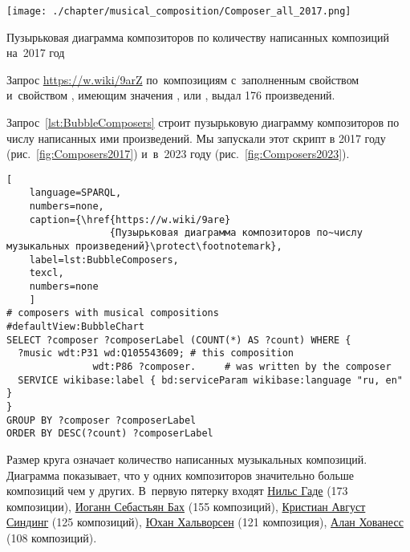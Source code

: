 \begin{marginfigure}[-0\baselineskip]
  \texttt{[image: ./chapter/musical\_composition/Composer\_all\_2017.png]}
  \vspace{-7pt}
  \caption[Пузырьковая диаграмма композиторов по количеству написанных композиций на~2017 год]{Пузырьковая диаграмма композиторов по количеству написанных композиций на~2017 год}%
  \label{fig:Composers2017}%
\end{marginfigure}

Запрос \href{https://w.wiki/9arZ}{https://w.wiki/9arZ} 
по~композициям с~заполненным свойством  
и~свойством , 
имеющим значения ,  или , 
выдал 176 произведений.


\newpage
Запрос~\ref{lst:BubbleComposers} строит пузырьковую диаграмму композиторов по числу написанных ими произведений.
Мы запускали этот скрипт в 2017 году (рис.~\ref{fig:Composers2017}) 
и~в~2023 году (рис.~\ref{fig:Composers2023}).


\begin{lstlisting}[ 
    language=SPARQL, 
    numbers=none,
    caption={\href{https://w.wiki/9are}
                  {Пузырьковая диаграмма композиторов по~числу музыкальных произведений}\protect\footnotemark},
    label=lst:BubbleComposers,
    texcl,
    numbers=none
    ]
# composers with musical compositions
#defaultView:BubbleChart
SELECT ?composer ?composerLabel (COUNT(*) AS ?count) WHERE {
  ?music wdt:P31 wd:Q105543609; # this composition
               wdt:P86 ?composer.     # was written by the composer
  SERVICE wikibase:label { bd:serviceParam wikibase:language "ru, en" }
}
GROUP BY ?composer ?composerLabel
ORDER BY DESC(?count) ?composerLabel
\end{lstlisting}%

Размер круга означает количество написанных музыкальных композиций. Диаграмма показывает, что у одних композиторов значительно больше композиций чем у других. В~первую пятерку входят \href{https://ru.wikipedia.org/wiki/Гаде,_Нильс}{Нильс Гаде} (\num{173} композиции), \href{https://ru.wikipedia.org/wiki/Бах,_Иоганн_Себастьян}{Иоганн Себастьян Бах} (\num{155} композиций), \href{https://ru.wikipedia.org/wiki/Синдинг,_Кристиан_Август}{Кристиан Август Синдинг} (\num{125} композиций), \href{https://ru.wikipedia.org/wiki/Хальворсен,_Юхан}{Юхан Хальворсен} (\num{121} композиция), \href{https://ru.wikipedia.org/wiki/Хованесс,_Алан}{Алан Хованесс} (\num{108} композиций).

